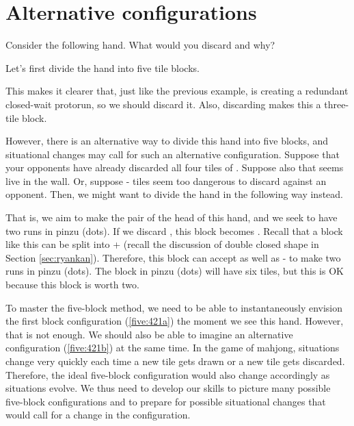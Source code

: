 \section{Alternative configurations}
Consider the following hand. What would you discard and why?

\bp
{}\zhong\zhong\zhong
\ep

Let's first divide the hand into five tile blocks.

\emj

This makes it clearer that, just like the previous example, {\LARGE{}} is creating a redundant closed-wait protorun, so we should discard it. Also, discarding {\LARGE{}} makes this a three-tile block.

\bigskip
However, there is an alternative way to divide this hand into five blocks, and situational changes may call for such an alternative configuration.
Suppose that your opponents have already discarded all four tiles of {\LARGE{}}. Suppose also that {\LARGE{}} seems live in the wall. Or, suppose {\LARGE{}-} tiles seem too dangerous to discard against an opponent. Then, we might want to divide the hand in the following way instead.

\emj

That is, we aim to make the pair of {\LARGE{}} the head of this hand, and we seek to have two runs in {\jap pinzu} (dots). If we discard {\LARGE{}}, this block becomes {\LARGE{}}.
Recall that a block like this can be split into {\LARGE{} + } (recall the discussion of double closed shape in Section \ref{sec:ryankan}). Therefore, this block can accept {\LARGE{}} as well as {\LARGE{}-} to make two runs in {\jap pinzu} (dots). The block in {\jap pinzu} (dots) will have six tiles, but this is OK because this block is worth two.

\bigskip
To master the five-block method, we need to be able to instantaneously envision the first block configuration (\ref{five:421a}) the moment we see this hand. However, that is not enough. We should also be able to imagine an alternative configuration (\ref{five:421b}) at the same time.
In the game of mahjong, situations change very quickly each time a new tile gets drawn or a new tile gets discarded. Therefore, the ideal five-block configuration would also change accordingly as situations evolve. We thus need to develop our skills to picture many possible five-block configurations and to prepare for possible situational changes that would call for a change in the configuration.


